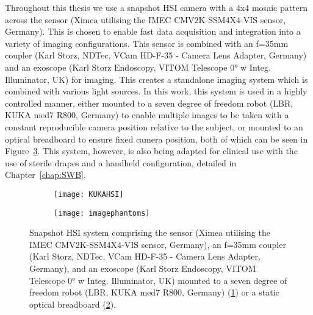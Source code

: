 Throughout this thesis we use a snapshot HSI camera with a 4x4 mosaic pattern across the sensor (Ximea utilising the IMEC CMV2K-SSM4X4-VIS sensor, Germany). This is chosen to enable fast data acquisition and integration into a variety of imaging configurations. This sensor is combined with an f=35mm coupler (Karl Storz, NDTec, VCam HD-F-35 - Camera Lens Adapter, Germany) and an exoscope (Karl Storz Endoscopy, VITOM Telescope 0° w Integ. Illuminator, UK) for imaging. This creates a standalone imaging system which is combined with various light sources. In this work, this system is used in a highly controlled manner, either mounted to a seven degree of freedom robot (LBR, KUKA med7 R800, Germany) to enable multiple images to be taken with a constant reproducible camera position relative to the subject, or mounted to an optical breadboard to ensure fixed camera position, both of which can be seen in Figure~\ref{fig:HSIsetups}. This system, however, is also being adapted for clinical use with the use of sterile drapes and a handheld configuration, detailed in Chapter~\ref{chap:SWB}. %
\begin{figure}[h]
    \centering 
    \begin{subfigure}[ht!]{0.45\textwidth}
	\texttt{[image: KUKAHSI]}
	\caption{}
	\label{fig:KUKAHSI}
    \end{subfigure}
    \begin{subfigure}[ht!]{0.267\textwidth}
        \texttt{[image: imagephantoms]}
        \caption{}
        \label{fig:ScopeHSI}
    \end{subfigure}
    \caption{Snapshot HSI system comprising the sensor (Ximea utilising the IMEC CMV2K-SSM4X4-VIS sensor, Germany), an f=35mm coupler (Karl Storz, NDTec, VCam HD-F-35 - Camera Lens Adapter, Germany), and an exoscope (Karl Storz Endoscopy, VITOM Telescope 0° w Integ. Illuminator, UK) mounted to a seven degree of freedom robot (LBR, KUKA med7 R800, Germany) (\ref{fig:KUKAHSI}) or a static optical breadboard (\ref{fig:ScopeHSI}).}
    \label{fig:HSIsetups}
\end{figure}
%

